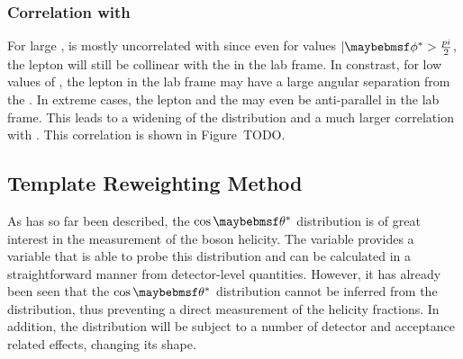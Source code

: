 \subsubsection{Correlation with \phistar}
For large \PtW, \LP is mostly uncorrelated with \phistar since even for values
$|\phistar > \frac{\pi}{2}$, the lepton will still be collinear with the \PW in
the lab frame. In constrast, for low values of \PtW, the lepton in the lab frame
may have a large angular separation from the \PW. In extreme cases, the lepton
and the \PW may even be anti-parallel in the lab frame. This leads to a widening
of the \LP distribution and a much larger correlation with
\phistar. This correlation is shown in Figure~TODO.

\subsection{Template Reweighting Method}
As has so far been described, the $\cos\thetastar$ distribution is of great
interest in the measurement of the \PW boson helicity. The \LP variable provides
a variable that is able to probe this distribution and can be calculated in a
straightforward manner from detector-level quantities. However, it has already
been seen that the $\cos\thetastar$ distribution cannot be inferred from the \LP
distribution, thus preventing a direct measurement of the helicity
fractions. In addition, the \LP distribution will be subject to a number of
detector and acceptance related effects, changing its shape.

